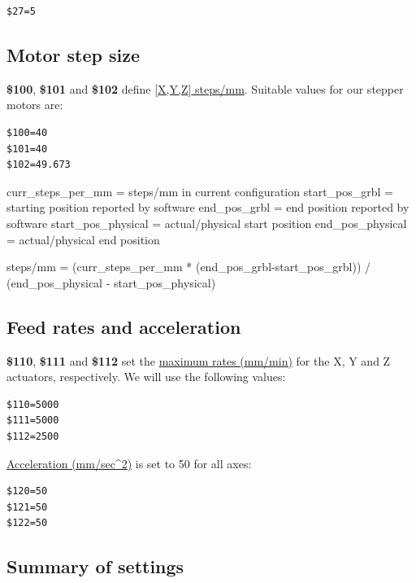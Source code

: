 \documentclass[]{book}
\theoremstyle{definition}
\theoremstyle{definition}
\theoremstyle{remark}
\begin{document}
\begin{verbatim}
$27=5
\end{verbatim}

\subsection{Motor step size}\label{motor-step-size}

\textbf{\$100}, \textbf{\$101} and \textbf{\$102} define
\href{https://github.com/gnea/grbl/wiki/Grbl-v1.1-Configuration\#100-101-and-102--xyz-stepsmm}{{[}X,Y,Z{]}
steps/mm}. Suitable values for our stepper motors are:

\begin{verbatim}
$100=40
$101=40
$102=49.673
\end{verbatim}

curr\_steps\_per\_mm = steps/mm in current configuration
start\_pos\_grbl = starting position reported by software end\_pos\_grbl
= end position reported by software start\_pos\_physical =
actual/physical start position end\_pos\_physical = actual/physical end
position

steps/mm = (curr\_steps\_per\_mm * (end\_pos\_grbl-start\_pos\_grbl)) /
(end\_pos\_physical - start\_pos\_physical)

\subsection{Feed rates and
acceleration}\label{feed-rates-and-acceleration}

\textbf{\$110}, \textbf{\$111} and \textbf{\$112} set the
\href{https://github.com/gnea/grbl/wiki/Grbl-v1.1-Configuration\#110-111-and-112--xyz-max-rate-mmmin}{maximum
rates (mm/min)} for the X, Y and Z actuators, respectively. We will use
the following values:

\begin{verbatim}
$110=5000
$111=5000
$112=2500
\end{verbatim}

\href{https://github.com/gnea/grbl/wiki/Grbl-v1.1-Configuration\#120-121-122--xyz-acceleration-mmsec2}{Acceleration
(mm/sec\^{}2)} is set to 50 for all axes:

\begin{verbatim}
$120=50
$121=50
$122=50
\end{verbatim}

\subsection{Summary of settings}\label{summary-of-settings}
\end{document}
